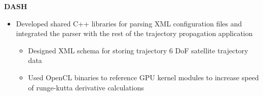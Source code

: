 \documentclass[a4paper]{article}
\begin{document}
\noindent
\hspace{0.120in}
\textbf{DASH}
\smallskip

\begin{itemize}
  \item Developed shared C++ libraries for parsing XML configuration files and integrated
    the parser with the rest of the trajectory propagation application
  \begin{itemize}
    \item Designed XML schema for storing trajectory 6 DoF satellite trajectory data
    \item Used OpenCL binaries to reference GPU kernel modules to increase speed of
      runge-kutta derivative calculations
   \end{itemize}
\end{itemize}

\end{document}
